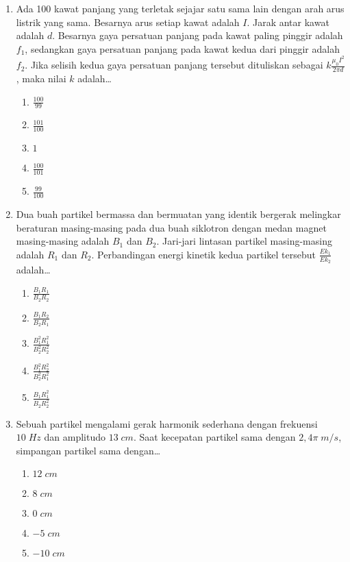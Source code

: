 \documentclass[A4,12PT, english, twocolumn]{journal}
\begin{document}
\begin{enumerate}
\item Ada 100 kawat panjang yang terletak sejajar satu sama lain dengan arah arus listrik yang sama. Besarnya arus setiap kawat adalah $I$. Jarak antar kawat adalah $d$. Besarnya gaya persatuan panjang pada kawat paling pinggir adalah $f_1$, sedangkan gaya persatuan panjang pada kawat kedua dari pinggir adalah $f_2$. Jika selisih kedua gaya persatuan panjang tersebut dituliskan sebagai $k \frac{\mu_0 I^2}{2\pi d}$, maka nilai $k$ adalah\dots
    \begin{enumerate}
        \item $\frac{100}{99}$
        \item $\frac{101}{100}$
        \item $1$
        \item $\frac{100}{101}$
        \item $\frac{99}{100}$
    \end{enumerate}

\item Dua buah partikel bermassa dan bermuatan yang identik bergerak melingkar beraturan masing-masing pada dua buah siklotron dengan medan magnet masing-masing adalah $B_1$ dan $B_2$. Jari-jari lintasan partikel masing-masing adalah $R_1$ dan $R_2$. Perbandingan energi kinetik kedua partikel tersebut $\frac{Ek_1}{Ek_2}$ adalah\dots
    \begin{enumerate}
        \item $\frac{B_1R_1}{B_2R_2}$
        \item $\frac{B_1R_2}{B_2R_1}$
        \item $\frac{B^2_1R^2_1}{B^2_2R^2_2}$
        \item $\frac{B^2_1R^2_2}{B^2_2R^2_1}$
        \item $\frac{B_1R^2_1}{B_2R^2_2}$
    \end{enumerate}

\item Sebuah partikel mengalami gerak harmonik sederhana dengan frekuensi $10 \; Hz$ dan amplitudo $13 \; cm$. Saat kecepatan partikel sama dengan $2,4\pi \; m/s$, simpangan partikel sama dengan\dots
    \begin{enumerate}
        \item $12 \; cm$
        \item $8 \; cm$
        \item $0 \; cm$
        \item $-5 \; cm$
        \item $-10 \; cm$
    \end{enumerate}


\end{enumerate}
\end{document}
